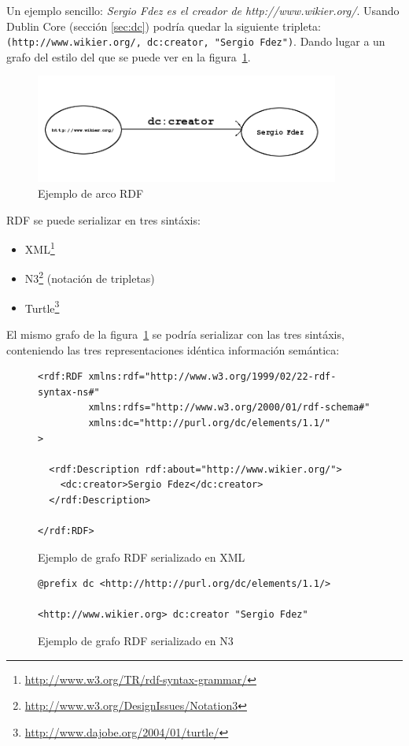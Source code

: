 Un ejemplo sencillo: \textit{Sergio Fdez es el creador de http://www.wikier.org/}. 
Usando Dublin Core (sección \ref{sec:dc}) podría quedar la siguiente tripleta: 
\texttt{(http://www.wikier.org/, dc:creator, "Sergio Fdez")}. Dando lugar a un 
grafo del estilo del que se puede ver en la figura~\ref{fig:rdfTripletExample}.

\begin{figure}[H]
	\centering
	\includegraphics[width=10cm]{images/arc-example.png}
	\caption{Ejemplo de arco RDF}
	\label{fig:rdfTripletExample}
\end{figure}


RDF se puede serializar en tres sintáxis: 

\begin{itemize}
 \item XML\footnote{\url{http://www.w3.org/TR/rdf-syntax-grammar/}}
 \item N3\footnote{\url{http://www.w3.org/DesignIssues/Notation3}} (notación de tripletas)
 \item Turtle\footnote{\url{http://www.dajobe.org/2004/01/turtle/}}
\end{itemize}

El mismo grafo de la figura~\ref{fig:rdfTripletExample} se podría serializar 
con las tres sintáxis, conteniendo las tres representaciones idéntica información 
semántica:

\begin{figure}[H]
\lstset{language=RDF}
\begin{lstlisting}
<rdf:RDF xmlns:rdf="http://www.w3.org/1999/02/22-rdf-syntax-ns#"
         xmlns:rdfs="http://www.w3.org/2000/01/rdf-schema#"
         xmlns:dc="http://purl.org/dc/elements/1.1/"
>

  <rdf:Description rdf:about="http://www.wikier.org/">
    <dc:creator>Sergio Fdez</dc:creator>
  </rdf:Description>

</rdf:RDF>
\end{lstlisting}
\caption{Ejemplo de grafo RDF serializado en XML}
\label{fig:ejemplo.rdfxml}
\end{figure}

\begin{figure}[H]
\lstset{language=XML}
\begin{lstlisting}
@prefix dc <http://http://purl.org/dc/elements/1.1/>

<http://www.wikier.org> dc:creator "Sergio Fdez"
\end{lstlisting}
\caption{Ejemplo de grafo RDF serializado en N3}
\label{fig:ejemplo.rdfn3}
\end{figure}

